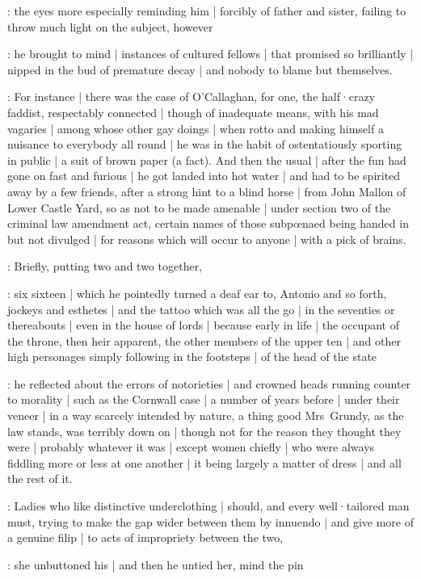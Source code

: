 :
the eyes more especially reminding him |
forcibly of father and sister,
failing to throw much light on the subject,
however

:
he brought to mind |
instances of cultured fellows |
that promised so brilliantly |
nipped in the bud of premature decay |
and nobody to blame but themselves.

:
For instance |
there was the case of O'Callaghan,
for one,
the half·crazy faddist,
respectably connected |
though of inadequate means,
with his mad vagaries |
among whose other gay doings |
when rotto and making himself a nuisance to everybody all round |
he was in the habit of ostentatiously sporting in public |
a suit of brown paper (a fact).
And then the usual  |
after the fun had gone on fast and furious |
he got landed into hot water |
and had to be spirited away by a few friends,
after a strong hint to a blind horse |
from John Mallon of Lower Castle Yard,
so as not to be made amenable |
under section two of the criminal law amendment act,
certain names of those subpœnaed being handed in but not divulged |
for reasons which will occur to anyone |
with a pick of brains.

:
Briefly,
putting two and two together,

:
six sixteen |
which he pointedly turned a deaf ear to,
Antonio and so forth,
jockeys and esthetes |
and the tattoo which was all the go |
in the seventies or thereabouts |
even in the house of lords |
because early in life |
the occupant of the throne,
then heir apparent,
the other members of the upper ten |
and other high personages%
simply following in the footsteps |
of the head of the state

:
he reflected about the errors of notorieties |
and crowned heads running counter to morality |
such as the Cornwall case |
a number of years before |
under their veneer |
in a way scarcely intended by nature,
a thing good Mrs~Grundy,
as the law stands,
was terribly down on |
though not for the reason they thought they were |
probably whatever it was |
except women chiefly |
who were always fiddling more or less at one another |
it being largely a matter of dress |
and all the rest of it.

:
Ladies who like distinctive underclothing |
should,
and every well·tailored man must,
trying to make the gap wider between them by innuendo |
and give more of a genuine filip |
to acts of impropriety between the two,%

:
she unbuttoned his |
and then he untied her,
mind the pin

